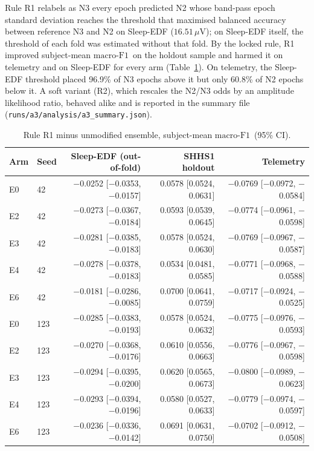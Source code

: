 \documentclass[10pt,a4paper]{article}
\newcommand{\mf}{\ensuremath{\mathrm{macro\text{-}F1}}}
\newcommand{\ci}{95\% CI}
\begin{document}
Rule R1 relabels as N3 every epoch predicted N2 whose band-pass epoch standard deviation reaches the threshold that
maximised balanced accuracy between reference N3 and N2 on Sleep-EDF ($16.51\,\mu$V); on Sleep-EDF itself, the
threshold of each fold was estimated without that fold. By the locked rule, R1 improved subject-mean \mf\ on the
holdout sample and harmed it on telemetry and on Sleep-EDF for every arm (Table~\ref{tab:sup_rule}). On telemetry,
the Sleep-EDF threshold placed 96.9\% of N3 epochs above it but only 60.8\% of N2 epochs below it. A soft variant
(R2), which rescales the N2/N3 odds by an amplitude likelihood ratio, behaved alike and is reported in the summary
file (\nolinkurl{runs/a3/analysis/a3_summary.json}).

\begin{table}[H]
\centering\small
\caption{Rule R1 minus unmodified ensemble, subject-mean \mf\ (\ci).}
\label{tab:sup_rule}
\begin{tabular}{llrrr}
\toprule
Arm & Seed & Sleep-EDF (out-of-fold) & SHHS1 holdout & Telemetry \\
\midrule
E0 & 42 & $-$0.0252 [$-$0.0353, $-$0.0157] & 0.0578 [0.0524, 0.0631] & $-$0.0769 [$-$0.0972, $-$0.0584] \\
E2 & 42 & $-$0.0273 [$-$0.0367, $-$0.0184] & 0.0593 [0.0539, 0.0645] & $-$0.0774 [$-$0.0961, $-$0.0598] \\
E3 & 42 & $-$0.0281 [$-$0.0385, $-$0.0183] & 0.0578 [0.0524, 0.0630] & $-$0.0769 [$-$0.0967, $-$0.0587] \\
E4 & 42 & $-$0.0278 [$-$0.0378, $-$0.0183] & 0.0534 [0.0481, 0.0585] & $-$0.0771 [$-$0.0968, $-$0.0588] \\
E6 & 42 & $-$0.0181 [$-$0.0286, $-$0.0085] & 0.0700 [0.0641, 0.0759] & $-$0.0717 [$-$0.0924, $-$0.0525] \\
E0 & 123 & $-$0.0285 [$-$0.0383, $-$0.0193] & 0.0578 [0.0524, 0.0632] & $-$0.0775 [$-$0.0976, $-$0.0593] \\
E2 & 123 & $-$0.0270 [$-$0.0368, $-$0.0176] & 0.0610 [0.0556, 0.0663] & $-$0.0776 [$-$0.0967, $-$0.0598] \\
E3 & 123 & $-$0.0294 [$-$0.0395, $-$0.0200] & 0.0620 [0.0565, 0.0673] & $-$0.0800 [$-$0.0989, $-$0.0623] \\
E4 & 123 & $-$0.0293 [$-$0.0394, $-$0.0196] & 0.0580 [0.0527, 0.0633] & $-$0.0779 [$-$0.0974, $-$0.0597] \\
E6 & 123 & $-$0.0236 [$-$0.0336, $-$0.0142] & 0.0691 [0.0631, 0.0750] & $-$0.0702 [$-$0.0912, $-$0.0508] \\
\bottomrule
\end{tabular}
\end{table}
\end{document}
